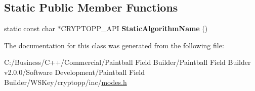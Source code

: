 \subsection*{Static Public Member Functions}
\begin{DoxyCompactItemize}
\item 
\hypertarget{class_c_b_c___mode_base_ad109c65e82179f2d03cd4cc41bee38dc}{
static const char $\ast$CRYPTOPP\_\-API {\bfseries StaticAlgorithmName} ()}
\label{class_c_b_c___mode_base_ad109c65e82179f2d03cd4cc41bee38dc}

\end{DoxyCompactItemize}


The documentation for this class was generated from the following file:\begin{DoxyCompactItemize}
\item 
C:/Business/C++/Commercial/Paintball Field Builder/Paintball Field Builder v2.0.0/Software Development/Paintball Field Builder/WSKey/cryptopp/inc/\hyperlink{modes_8h}{modes.h}\end{DoxyCompactItemize}

